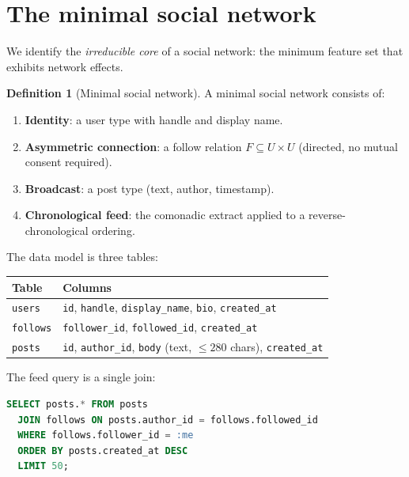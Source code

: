 \documentclass[11pt,a4paper]{article}
\theoremstyle{definition}
\newtheorem{definition}{Definition}[section]
\theoremstyle{plain}
\theoremstyle{remark}
\begin{document}
\section{The minimal social network}
\label{sec:minimal}

We identify the \emph{irreducible core} of a social network: the
minimum feature set that exhibits network effects.

\begin{definition}[Minimal social network]
A minimal social network consists of:
\begin{enumerate}[nosep]
  \item \textbf{Identity}: a user type with handle and display name.
  \item \textbf{Asymmetric connection}: a follow relation $F \subseteq U \times U$
    (directed, no mutual consent required).
  \item \textbf{Broadcast}: a post type (text, author, timestamp).
  \item \textbf{Chronological feed}: the comonadic extract applied to
    a reverse-chronological ordering.
\end{enumerate}
\end{definition}

The data model is three tables:

\begin{center}
\begin{tabular}{@{}ll@{}}
\toprule
\textbf{Table} & \textbf{Columns} \\
\midrule
\texttt{users} & \texttt{id}, \texttt{handle}, \texttt{display\_name}, \texttt{bio}, \texttt{created\_at} \\
\texttt{follows} & \texttt{follower\_id}, \texttt{followed\_id}, \texttt{created\_at} \\
\texttt{posts} & \texttt{id}, \texttt{author\_id}, \texttt{body} (text, $\le 280$ chars), \texttt{created\_at} \\
\bottomrule
\end{tabular}
\end{center}

The feed query is a single join:

\begin{lstlisting}[language=SQL,basicstyle=\ttfamily\small]
SELECT posts.* FROM posts
  JOIN follows ON posts.author_id = follows.followed_id
  WHERE follows.follower_id = :me
  ORDER BY posts.created_at DESC
  LIMIT 50;
\end{lstlisting}
\end{document}
